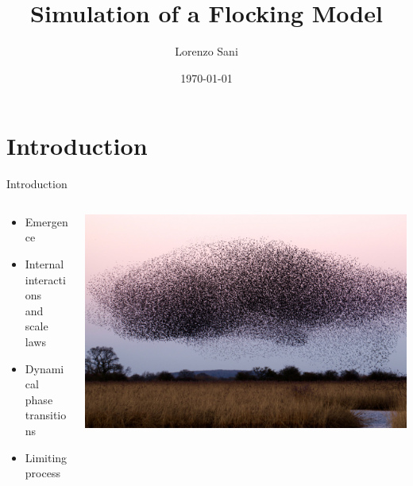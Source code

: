 \documentclass{beamer}
\title[Simple Flocking]{Simulation of a Flocking Model}
\author{Lorenzo Sani}
\institute{Università degli Studi di Bologna}
\date{\today}
\begin{document}
\begin{frame}
  \titlepage
\end{frame}


\section{Introduction}

\begin{frame}{Introduction}
\begin{minipage}[0.95\textheight]{\textwidth}
\begin{columns}[T]
\begin{column}{0.30\textwidth}
\begin{itemize}
  \item Emergence
  \vspace{0.2cm}
  \item Internal interactions \\and scale  laws
  \vspace{0.2cm}
  \item Dynamical phase transitions
  \vspace{0.2cm}
  \item Limiting process
\end{itemize}
\end{column}
\begin{column}{0.65\textwidth}
	\vspace*{0.6cm}
	\centering
\includegraphics[width=\textwidth, keepaspectratio]{../images/flock_image.jpeg}
\end{column}
\end{columns}
\end{minipage}
\end{frame}
\end{document}
